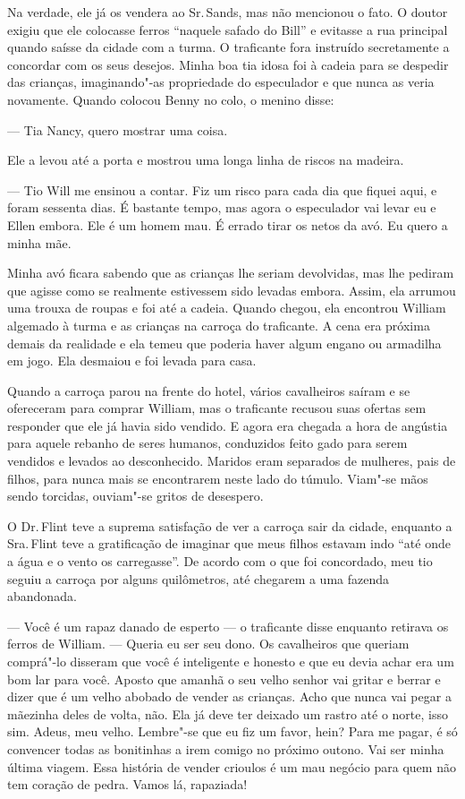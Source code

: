 Na verdade, ele já os vendera ao Sr.\,Sands, mas não mencionou o fato. O
doutor exigiu que ele colocasse ferros ``naquele safado do Bill'' e
evitasse a rua principal quando saísse da cidade com a turma. O
traficante fora instruído secretamente a concordar com os seus desejos.
Minha boa tia idosa foi à cadeia para se despedir das crianças,
imaginando"-as propriedade do especulador e que nunca as veria novamente.
Quando colocou Benny no colo, o menino disse:

--- Tia Nancy, quero mostrar uma coisa.

Ele a levou até a porta e mostrou uma longa linha de riscos na madeira.

--- Tio Will me ensinou a contar. Fiz um risco para cada dia que fiquei
aqui, e foram sessenta dias. É bastante tempo, mas agora o especulador
vai levar eu e Ellen embora. Ele é um homem mau. É errado tirar os netos
da avó. Eu quero a minha mãe.

Minha avó ficara sabendo que as
crianças lhe seriam devolvidas, mas lhe pediram que agisse como se
realmente estivessem sido levadas embora. Assim, ela arrumou uma trouxa
de roupas e foi até a cadeia. Quando chegou, ela encontrou William
algemado à turma e as crianças na carroça do traficante. A cena era
próxima demais da realidade e ela temeu que poderia haver algum engano
ou armadilha em jogo. Ela desmaiou e foi levada para casa.

Quando a carroça parou na frente do
hotel, vários cavalheiros saíram e se ofereceram para comprar William,
mas o traficante recusou suas ofertas sem responder que ele já havia
sido vendido. E agora era chegada a hora de angústia para aquele rebanho
de seres humanos, conduzidos feito gado para serem vendidos e levados ao
desconhecido. Maridos eram separados de mulheres, pais de filhos, para
nunca mais se encontrarem neste lado do túmulo. Viam"-se mãos sendo
torcidas, ouviam"-se gritos de desespero.

O Dr.\,Flint teve a suprema satisfação
de ver a carroça sair da cidade, enquanto a Sra.\,Flint teve a
gratificação de imaginar que meus filhos estavam indo ``até onde a água
e o vento os carregasse''. De acordo com o que foi concordado, meu tio
seguiu a carroça por alguns quilômetros, até chegarem a uma fazenda
abandonada.

--- Você é um rapaz danado de esperto --- o traficante disse enquanto
retirava os ferros de William. --- Queria eu ser seu dono. Os
cavalheiros que queriam comprá"-lo disseram que você é inteligente e
honesto e que eu devia achar era um bom lar para você. Aposto que amanhã
o seu velho senhor vai gritar e berrar e dizer que é um velho abobado de
vender as crianças. Acho que nunca vai pegar a mãezinha deles de volta,
não. Ela já deve ter deixado um rastro até o norte, isso sim. Adeus, meu
velho. Lembre"-se que eu fiz um favor, hein? Para me pagar, é só
convencer todas as bonitinhas a irem comigo no próximo outono. Vai ser
minha última viagem. Essa história de vender crioulos é um mau negócio
para quem não tem coração de pedra. Vamos lá, rapaziada!

